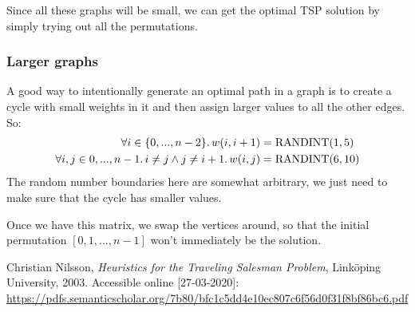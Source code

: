 \documentclass{article}
\newcommand{\randint}{\operatorname{RANDINT}}
\begin{document}
Since all these graphs will be small, we can get the optimal TSP solution by
simply trying out all the permutations.

\subsubsection{Larger graphs}

A good way to intentionally generate an optimal path in a graph is to create
a cycle with small weights in it and then assign larger values to all the other
edges. So:
\begin{align*}\forall i\in\{0,...,n-2\}\ldotp w(i,i+1) & =\randint(1,5)\\
  \forall i,j\in{0,...,n-1}\ldotp i\ne j \wedge j\ne i+1 \ldotp
  w(i,j) & = \randint(6,10) \\
\end{align*}
The random number boundaries here are somewhat arbitrary, we just need to make
sure that the cycle has smaller values.

Once we have this matrix, we swap the vertices around, so that the initial
permutation $[0,1,...,n-1]$ won't immediately be the solution.



\begin{thebibliography}{9}
  Christian Nilsson,
  \textit{Heuristics for the Traveling Salesman Problem},
  Link\"oping University,
  2003.
  Accessible online [27-03-2020]: \url{https://pdfs.semanticscholar.org/7b80/bfc1c5dd4e10ec807c6f56d0f31f8bf86bc6.pdf}
\end{thebibliography}
\end{document}
